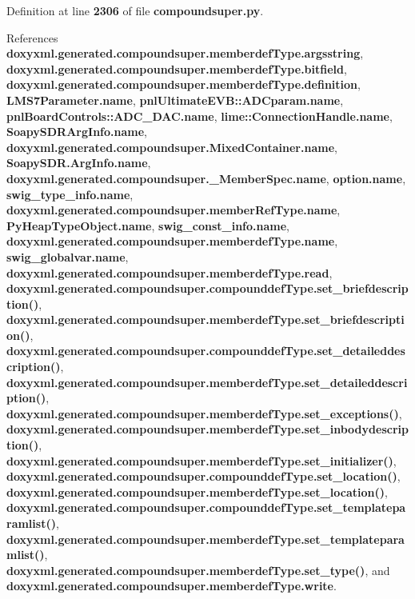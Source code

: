 Definition at line {\bf 2306} of file {\bf compoundsuper.\+py}.



References {\bf doxyxml.\+generated.\+compoundsuper.\+memberdef\+Type.\+argsstring}, {\bf doxyxml.\+generated.\+compoundsuper.\+memberdef\+Type.\+bitfield}, {\bf doxyxml.\+generated.\+compoundsuper.\+memberdef\+Type.\+definition}, {\bf L\+M\+S7\+Parameter.\+name}, {\bf pnl\+Ultimate\+E\+V\+B\+::\+A\+D\+Cparam.\+name}, {\bf pnl\+Board\+Controls\+::\+A\+D\+C\+\_\+\+D\+A\+C.\+name}, {\bf lime\+::\+Connection\+Handle.\+name}, {\bf Soapy\+S\+D\+R\+Arg\+Info.\+name}, {\bf doxyxml.\+generated.\+compoundsuper.\+Mixed\+Container.\+name}, {\bf Soapy\+S\+D\+R.\+Arg\+Info.\+name}, {\bf doxyxml.\+generated.\+compoundsuper.\+\_\+\+Member\+Spec.\+name}, {\bf option.\+name}, {\bf swig\+\_\+type\+\_\+info.\+name}, {\bf doxyxml.\+generated.\+compoundsuper.\+member\+Ref\+Type.\+name}, {\bf Py\+Heap\+Type\+Object.\+name}, {\bf swig\+\_\+const\+\_\+info.\+name}, {\bf doxyxml.\+generated.\+compoundsuper.\+memberdef\+Type.\+name}, {\bf swig\+\_\+globalvar.\+name}, {\bf doxyxml.\+generated.\+compoundsuper.\+memberdef\+Type.\+read}, {\bf doxyxml.\+generated.\+compoundsuper.\+compounddef\+Type.\+set\+\_\+briefdescription()}, {\bf doxyxml.\+generated.\+compoundsuper.\+memberdef\+Type.\+set\+\_\+briefdescription()}, {\bf doxyxml.\+generated.\+compoundsuper.\+compounddef\+Type.\+set\+\_\+detaileddescription()}, {\bf doxyxml.\+generated.\+compoundsuper.\+memberdef\+Type.\+set\+\_\+detaileddescription()}, {\bf doxyxml.\+generated.\+compoundsuper.\+memberdef\+Type.\+set\+\_\+exceptions()}, {\bf doxyxml.\+generated.\+compoundsuper.\+memberdef\+Type.\+set\+\_\+inbodydescription()}, {\bf doxyxml.\+generated.\+compoundsuper.\+memberdef\+Type.\+set\+\_\+initializer()}, {\bf doxyxml.\+generated.\+compoundsuper.\+compounddef\+Type.\+set\+\_\+location()}, {\bf doxyxml.\+generated.\+compoundsuper.\+memberdef\+Type.\+set\+\_\+location()}, {\bf doxyxml.\+generated.\+compoundsuper.\+compounddef\+Type.\+set\+\_\+templateparamlist()}, {\bf doxyxml.\+generated.\+compoundsuper.\+memberdef\+Type.\+set\+\_\+templateparamlist()}, {\bf doxyxml.\+generated.\+compoundsuper.\+memberdef\+Type.\+set\+\_\+type()}, and {\bf doxyxml.\+generated.\+compoundsuper.\+memberdef\+Type.\+write}.



